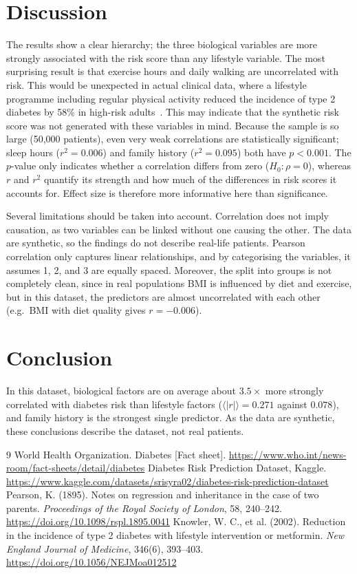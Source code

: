 \documentclass{article}
\begin{document}
\section{Discussion}
The results show a clear hierarchy; the three biological variables are more strongly associated with the risk score than any lifestyle variable. The most surprising result is that exercise hours and daily walking are uncorrelated with risk. This would be unexpected in actual clinical data, where a lifestyle programme including regular physical activity reduced the incidence of type 2 diabetes by 58\% in high-risk adults~\cite{knowler}. This may indicate that the synthetic risk score was not generated with these variables in mind. Because the sample is so large (50,000 patients), even very weak correlations are statistically significant; sleep hours ($r^2=0.006$) and family history ($r^2=0.095$) both have $p<0.001$. The $p$-value only indicates whether a correlation differs from zero ($H_0:\rho=0$), whereas $r$ and $r^2$ quantify its strength and how much of the differences in risk scores it accounts for. Effect size is therefore more informative here than significance.

Several limitations should be taken into account. Correlation does not imply causation, as two variables can be linked without one causing the other. The data are synthetic, so the findings do not describe real-life patients. Pearson correlation only captures linear relationships, and by categorising the variables, it assumes 1, 2, and 3 are equally spaced. Moreover, the split into groups is not completely clean, since in real populations BMI is influenced by diet and exercise, but in this dataset, the predictors are almost uncorrelated with each other (e.g.\ BMI with diet quality gives $r=-0.006$).

\section{Conclusion}

In this dataset, biological factors are on average about $3.5\times$ more strongly correlated with diabetes risk than lifestyle factors ($\langle|r|\rangle=0.271$ against $0.078$), and family history is the strongest single predictor. As the data are synthetic, these conclusions describe the dataset, not real patients. 
{\footnotesize
\setlength{\itemsep}{0pt}\setlength{\parskip}{0pt}
\begin{thebibliography}{9}
 World Health Organization. Diabetes [Fact sheet].
\url{https://www.who.int/news-room/fact-sheets/detail/diabetes}
 Diabetes Risk Prediction Dataset, Kaggle.
\url{https://www.kaggle.com/datasets/srisyra02/diabetes-risk-prediction-dataset}
 Pearson, K. (1895). Notes on regression and inheritance in the case of two parents. \textit{Proceedings of the Royal Society of London}, 58, 240--242.
\url{https://doi.org/10.1098/rspl.1895.0041}
 Knowler, W. C., et al. (2002). Reduction in the incidence of type 2 diabetes with lifestyle intervention or metformin. \textit{New England Journal of Medicine}, 346(6), 393--403.
\url{https://doi.org/10.1056/NEJMoa012512}
\end{thebibliography}
}
\end{document}
